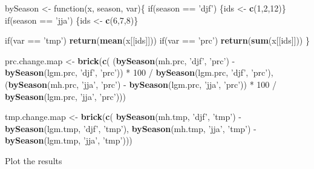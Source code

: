 \documentclass[11pt,]{tufte-handout}
\newenvironment{Shaded}{}{}
\newcommand{\KeywordTok}[1]{\textcolor[rgb]{0.00,0.44,0.13}{\textbf{{#1}}}}
\newcommand{\DecValTok}[1]{\textcolor[rgb]{0.25,0.63,0.44}{{#1}}}
\newcommand{\StringTok}[1]{\textcolor[rgb]{0.25,0.44,0.63}{{#1}}}
\newcommand{\NormalTok}[1]{{#1}}
\begin{document}
\begin{Shaded}
\begin{Highlighting}[]
\NormalTok{bySeason <-}\StringTok{ }\NormalTok{function(x, season, var)\{}
  \NormalTok{if(season ==}\StringTok{ 'djf'}\NormalTok{) \{ids <-}\StringTok{ }\KeywordTok{c}\NormalTok{(}\DecValTok{1}\NormalTok{,}\DecValTok{2}\NormalTok{,}\DecValTok{12}\NormalTok{)\}}
  \NormalTok{if(season ==}\StringTok{ 'jja'}\NormalTok{) \{ids <-}\StringTok{ }\KeywordTok{c}\NormalTok{(}\DecValTok{6}\NormalTok{,}\DecValTok{7}\NormalTok{,}\DecValTok{8}\NormalTok{)\}}
  
  \NormalTok{if(var ==}\StringTok{ 'tmp'}\NormalTok{) }\KeywordTok{return}\NormalTok{(}\KeywordTok{mean}\NormalTok{(x[[ids]]))}
  \NormalTok{if(var ==}\StringTok{ 'prc'}\NormalTok{) }\KeywordTok{return}\NormalTok{(}\KeywordTok{sum}\NormalTok{(x[[ids]]))}
\NormalTok{\}}

\NormalTok{prc.change.map <-}\StringTok{ }\KeywordTok{brick}\NormalTok{(}\KeywordTok{c}\NormalTok{(}
  \NormalTok{(}\KeywordTok{bySeason}\NormalTok{(mh.prc, }\StringTok{'djf'}\NormalTok{, }\StringTok{'prc'}\NormalTok{) -}\StringTok{ }\KeywordTok{bySeason}\NormalTok{(lgm.prc, }\StringTok{'djf'}\NormalTok{, }\StringTok{'prc'}\NormalTok{)) *}\StringTok{ }\DecValTok{100} \NormalTok{/}\StringTok{ }\KeywordTok{bySeason}\NormalTok{(lgm.prc, }\StringTok{'djf'}\NormalTok{, }\StringTok{'prc'}\NormalTok{),}
  \NormalTok{(}\KeywordTok{bySeason}\NormalTok{(mh.prc, }\StringTok{'jja'}\NormalTok{, }\StringTok{'prc'}\NormalTok{) -}\StringTok{ }\KeywordTok{bySeason}\NormalTok{(lgm.prc, }\StringTok{'jja'}\NormalTok{, }\StringTok{'prc'}\NormalTok{)) *}\StringTok{ }\DecValTok{100} \NormalTok{/}\StringTok{ }\KeywordTok{bySeason}\NormalTok{(lgm.prc, }\StringTok{'jja'}\NormalTok{, }\StringTok{'prc'}\NormalTok{)))}

\NormalTok{tmp.change.map <-}\StringTok{ }\KeywordTok{brick}\NormalTok{(}\KeywordTok{c}\NormalTok{(}
  \KeywordTok{bySeason}\NormalTok{(mh.tmp, }\StringTok{'djf'}\NormalTok{, }\StringTok{'tmp'}\NormalTok{) -}\StringTok{ }\KeywordTok{bySeason}\NormalTok{(lgm.tmp, }\StringTok{'djf'}\NormalTok{, }\StringTok{'tmp'}\NormalTok{),}
  \KeywordTok{bySeason}\NormalTok{(mh.tmp, }\StringTok{'jja'}\NormalTok{, }\StringTok{'tmp'}\NormalTok{) -}\StringTok{ }\KeywordTok{bySeason}\NormalTok{(lgm.tmp, }\StringTok{'jja'}\NormalTok{, }\StringTok{'tmp'}\NormalTok{)))}
\end{Highlighting}
\end{Shaded}

Plot the results
\end{document}
